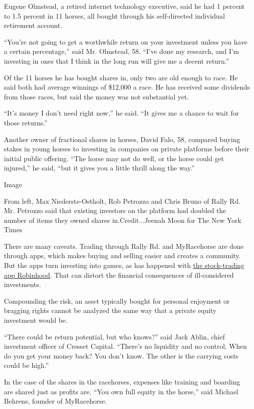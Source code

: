 Eugene Olmstead, a retired internet technology executive, said he had 1
percent to 1.5 percent in 11 horses, all bought through his
self-directed individual retirement account.

``You're not going to get a worthwhile return on your investment unless
you have a certain percentage,'' said Mr. Olmstead, 58. ``I've done my
research, and I'm investing in ones that I think in the long run will
give me a decent return.''

Of the 11 horses he has bought shares in, only two are old enough to
race. He said both had average winnings of \$12,000 a race. He has
received some dividends from those races, but said the money was not
substantial yet.

``It's money I don't need right now,'' he said. ``It gives me a chance
to wait for those returns.''

Another owner of fractional shares in horses, David Falo, 58, compared
buying stakes in young horses to investing in companies on private
platforms before their initial public offering. ``The horse may not do
well, or the horse could get injured,'' he said, ``but it gives you a
little thrill along the way.''

Image

From left, Max Niederste-Ostholt, Rob Petrozzo and Chris Bruno of Rally
Rd. Mr. Petrozzo said that existing investors on the platform had
doubled the number of items they owned shares in.Credit...Jeenah Moon
for The New York Times

There are many caveats. Trading through Rally Rd. and MyRacehorse are
done through apps, which makes buying and selling easier and creates a
community. But the apps turn investing into games, as has happened with
\href{https://www.nytimes.com/2020/07/08/technology/robinhood-risky-trading.html}{the
stock-trading app Robinhood}. That can distort the financial
consequences of ill-considered investments.

Compounding the risk, an asset typically bought for personal enjoyment
or bragging rights cannot be analyzed the same way that a private equity
investment would be.

``There could be return potential, but who knows?'' said Jack Ablin,
chief investment officer of Cresset Capital. ``There's no liquidity and
no control. When do you get your money back? You don't know. The other
is the carrying costs could be high.''

In the case of the shares in the racehorses, expenses like training and
boarding are shared just as profits are. ``You own full equity in the
horse,'' said Michael Behrens, founder of MyRacehorse.

